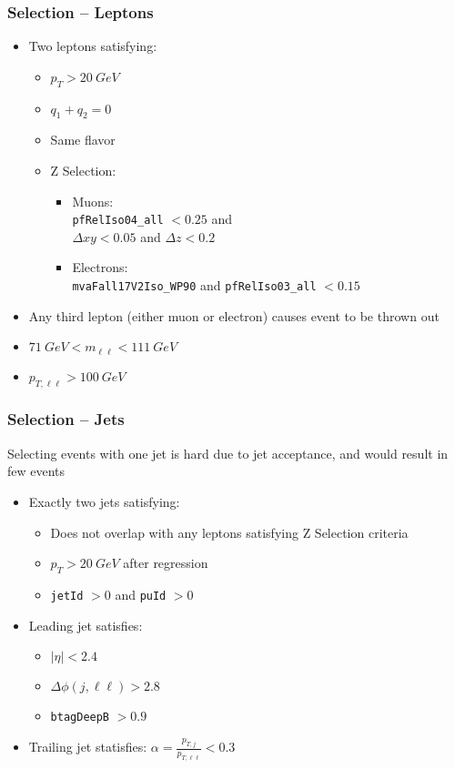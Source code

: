 \documentclass{beamer}
\begin{document}
\begin{frame}
  \frametitle{Selection -- Leptons}

  \begin{itemize}
  \item Two leptons satisfying:
    \begin{itemize}
    \item $p_T > \SI{20}{GeV}$
    \item $q_1 + q_2 = 0$
    \item Same flavor
    \item Z Selection:
      \begin{itemize}
      \item Muons: \\
        \texttt{pfRelIso04\_all} $< 0.25$ and \\
        $\Delta xy < 0.05$ and $\Delta z < 0.2$
      \item Electrons: \\
        \texttt{mvaFall17V2Iso\_WP90} and \texttt{pfRelIso03\_all} $< 0.15$
      \end{itemize}
    \end{itemize}
  \item Any third lepton (either muon or electron) causes event to be thrown out
  \item $\SI{71}{GeV} < m_{\ell\ell} < \SI{111}{GeV}$
  \item $p_{T,\ell\ell} > \SI{100}{GeV}$
  \end{itemize}

\end{frame}


\begin{frame}
  \frametitle{Selection -- Jets}

  Selecting events with one jet is hard due to jet acceptance,
  and would result in few events

  \vfill

  \begin{itemize}
  \item Exactly two jets satisfying:
    \begin{itemize}
    \item Does not overlap with any leptons satisfying Z Selection criteria
    \item $p_T > \SI{20}{GeV}$ after regression
    \item \texttt{jetId} $> 0$ and \texttt{puId} $> 0$
    \end{itemize}
  \item Leading jet satisfies:
    \begin{itemize}
    \item $|\eta| < 2.4$
    \item $\Delta\phi(j, \ell\ell) > 2.8$
    \item \texttt{btagDeepB} $> 0.9$
    \end{itemize}
  \item Trailing jet statisfies: $\alpha = \frac{p_{T, j}}{p_{T, \ell\ell}} < 0.3$
  \end{itemize}

\end{frame}
\end{document}
